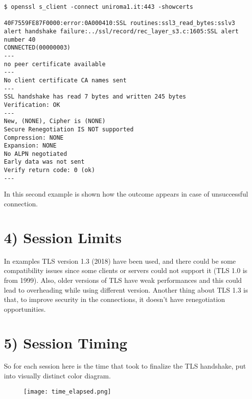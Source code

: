 \documentclass{article}
\begin{document}
\begin{verbatim}
$ openssl s_client -connect uniroma1.it:443 -showcerts

40F7559FE87F0000:error:0A000410:SSL routines:ssl3_read_bytes:sslv3 alert handshake failure:../ssl/record/rec_layer_s3.c:1605:SSL alert number 40
CONNECTED(00000003)
---
no peer certificate available
---
No client certificate CA names sent
---
SSL handshake has read 7 bytes and written 245 bytes
Verification: OK
---
New, (NONE), Cipher is (NONE)
Secure Renegotiation IS NOT supported
Compression: NONE
Expansion: NONE
No ALPN negotiated
Early data was not sent
Verify return code: 0 (ok)
---
\end{verbatim}

In this second example is shown how the outcome appears in case of unsuccessful connection.\\

\section*{4) Session Limits}
In examples TLS version 1.3 (2018) have been used, and there could be some compatibility issues since some clients or servers could not support it (TLS 1.0 is from 1999). Also, older versions of TLS have weak performances and this could lead to overheading while using different version. Another thing about TLS 1.3 is that, to improve security in the connections, it doesn't have renegotiation opportunities.

\section*{5) Session Timing}
So for each session here is the time that took to finalize the TLS handshake, put into visually distinct color diagram.\\

\begin{figure}[h]
  \centering
  \texttt{[image: time\_elapsed.png]}
  \caption{}
  \label{fig:enc}
\end{figure}
\end{document}
